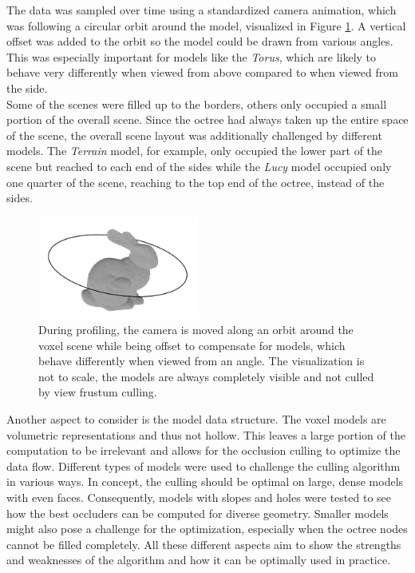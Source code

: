 \noindent
The data was sampled over time using a standardized camera animation, which was following a circular orbit 
around the model, visualized in Figure \ref{fig:test-anim-camera-path}. A vertical offset was added to the orbit 
so the model could be drawn from various angles. This was especially important for models like the \emph{Torus}, 
which are likely to behave very differently when viewed from above compared to when viewed from the side. \\

\noindent
Some of the scenes were filled up to the borders, others only occupied a small portion of the overall scene. 
Since the octree had always taken up the entire space of the scene, the overall scene layout was additionally 
challenged by different models. The \emph{Terrain} model, for example, only occupied the lower part of the 
scene but reached to each end of the sides while the \emph{Lucy} model occupied only one quarter of the scene, 
reaching to the top end of the octree, instead of the sides. \\

\begin{figure}[h]
    \centering
    \includegraphics[width=200px]{images/graphics/test-anim-camera-path.jpg}
    \caption{During profiling, the camera is moved along an orbit around the voxel scene while being offset to compensate 
    for models, which behave differently when viewed from an angle. The visualization is not to scale, the models 
    are always completely visible and not culled by view frustum culling.}
    \label{fig:test-anim-camera-path}
\end{figure}

Another aspect to consider is the model data structure. The voxel models are volumetric representations and thus 
not hollow. This leaves a large portion of the computation to be irrelevant and allows for the occlusion culling to 
optimize the data flow. Different types of models were used to challenge the culling algorithm in various ways. 
In concept, the culling should be optimal on large, dense models with even faces. Consequently, models with 
slopes and holes were tested to see how the best occluders can be computed for diverse geometry. Smaller models might 
also pose a challenge for the optimization, especially when the octree nodes cannot be filled completely. All these 
different aspects aim to show the strengths and weaknesses of the algorithm and how it can be optimally used in practice. \\

